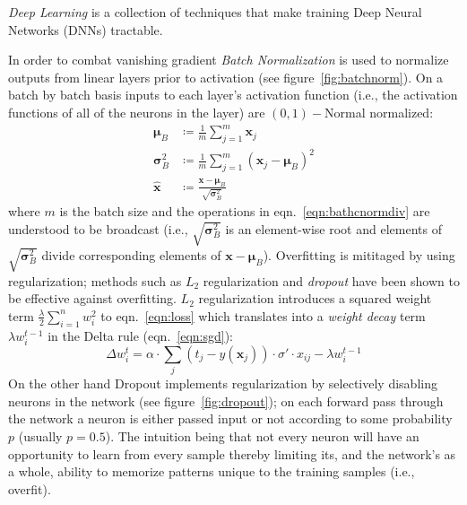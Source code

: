 \textit{Deep Learning} is a collection of techniques that make training Deep Neural Networks (DNNs) tractable.
%


In order to combat vanishing gradient \textit{Batch Normalization}\cite{ioffe2015batch} is used to normalize outputs from linear layers prior to activation (see figure~\ref{fig:batchnorm}).
%
On a batch by batch basis inputs to each layer's activation function (i.e., the activation functions of all of the neurons in the layer) are \((0,1)-\)Normal normalized:
\begin{align}
    \bm{\mu} _{B}        & \coloneqq {\frac {1}{m}}\sum _{j=1}^{m}\bm{x}_{j}                                             \\
    \bm{\sigma} _{B}^{2} & \coloneqq{\frac {1}{m}}\sum _{j=1}^{m}(\bm{x}_{j}-\bm{\mu}_{B})^{2}                           \\
    {\hat {\bm{x}}}      & \coloneqq {\frac {\bm{x}-\bm{\mu}_{B}}{\sqrt {\bm{\sigma}_{B}^{2}}}} \label{eqn:bathcnormdiv}
\end{align}
where \(m\) is the batch size and the operations in eqn.~\eqref{eqn:bathcnormdiv} are understood to be broadcast (i.e., \(\sqrt {\bm{\sigma} _{B}^{2}}\) is an element-wise root and elements of \(\sqrt {\bm{\sigma} _{B}^{2}}\) divide corresponding elements of \(\bm{x}-\bm{\mu}_{B}\)).
%
Overfitting is mititaged by using regularization; methods such as \(L_2\) regularization and \textit{dropout} have been shown to be effective against overfitting\cite{bengio2013}.
%
\(L_2\) regularization introduces a squared weight term \(\frac{\lambda}{2}\sum_{i=1}^n w_i^2\) to eqn.~\eqref{eqn:loss} which translates into a \textit{weight decay} term \(\lambda w_i^{t-1}\) in the Delta rule (eqn.~\eqref{eqn:sgd}):
\begin{equation}
    \Delta w_i^t = \alpha \cdot \sum_j (t_j-y(\mathbf{x}_j))\cdot \sigma'\cdot x_{ij} - \lambda w_i^{t-1}
    \label{eqn:weightdecaydelta}
\end{equation}
On the other hand Dropout implements regularization by selectively disabling neurons in the network (see figure~\ref{fig:dropout}); on each forward pass through the network a neuron is either passed input or not according to some probability \(p\) (usually \(p = 0.5\)).
%
The intuition being that not every neuron will have an opportunity to learn from every sample thereby limiting its, and the network's as a whole, ability to memorize patterns unique to the training samples (i.e., overfit).

